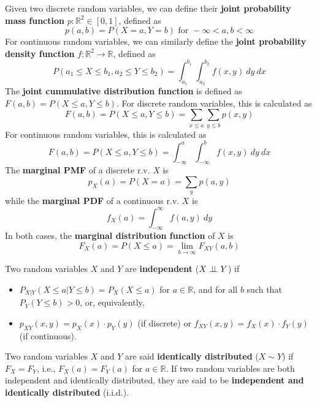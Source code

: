 Given two discrete random variables, we can define their \textbf{joint probability mass function} $p: \mathbb{R}^2 \in [0,1]$, defined as
\begin{equation*}
    p(a,b) = P(X = a, Y = b) \text{ for } -\infty < a,b < \infty
\end{equation*}
For continuous random variables, we can similarly define the \textbf{joint probability density function} $f: \mathbb{R}^2 \rightarrow \mathbb{R}$, defined as
\begin{equation*}
    P(a_1 \leq X \leq b_1, a_2 \leq Y \leq b_2) = \int_{a_1}^{b_1} \int_{a_2}^{b_2} f(x,y) \ dy \ dx
\end{equation*}
The \textbf{joint cummulative distribution function} is defined as $F(a,b) = P(X \leq a, Y \leq b)$. For discrete random variables, this is calculated as
\begin{equation*}
    F(a,b) = P(X \leq a, Y \leq b) = \sum_{x \leq a} \sum_{y \leq b} p(x,y)
\end{equation*}
For continuous random variables, this is calculated as
\begin{equation*}
    F(a,b) = P(X \leq a, Y \leq b) = \int_{-\infty}^a \int_{-\infty}^b f(x,y) \ dy \ dx
\end{equation*}
The \textbf{marginal PMF} of a discrete r.v. $X$ is
\begin{equation*}
    p_X(a) = P(X = a) = \sum_{y} p(a,y)
\end{equation*}
while the \textbf{marginal PDF} of a continuous r.v. $X$ is
\begin{equation*}
    f_X(a) = \int_{-\infty}^{\infty} f(a,y) \ dy
\end{equation*}
In both cases, the \textbf{marginal distribution function} of $X$ is
\begin{equation*}
    F_X(a) = P(X \leq a) = \lim_{b \to \infty} F_{XY}(a,b)
\end{equation*}

Two random variables $X$ and $Y$ are \textbf{independent} ($X \perp \!\!\! \perp Y$) if
\begin{itemize}
    \item $P_{X|Y} (X \leq a | Y \leq b) = P_X(X \leq a)$ for $a \in \mathbb{R}$, and for all $b$ such that $P_Y(Y \leq b) > 0$, or, equivalently,
    \item $p_{XY} (x,y) = p_X(x) \cdot p_Y(y)$ (if discrete) or $f_{XY} (x,y) = f_X(x) \cdot f_Y(y)$ (if continuous).
\end{itemize}
Two random variables $X$ and $Y$ are said \textbf{identically distributed} ($X \sim Y$) if $F_X = F_Y$, i.e., $F_X(a) = F_Y(a)$ for $a \in \mathbb{R}$. If two random variables are both independent and identically distributed, they are said to be \textbf{independent and identically distributed} (i.i.d.).

